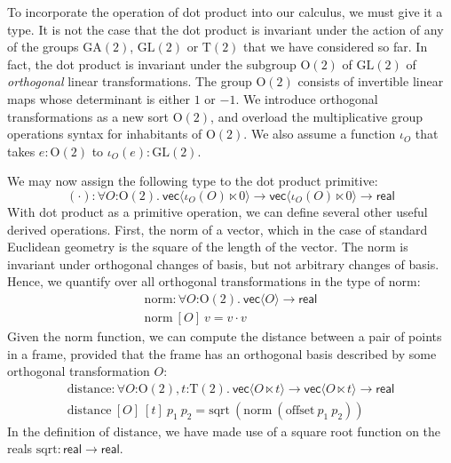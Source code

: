 \documentclass{article}
\newcommand{\GA}{\mathrm{GA}}
\newcommand{\GL}{\mathrm{GL}}
\newcommand{\Orth}{\mathrm{O}}
\newcommand{\Transl}{\mathrm{T}}
\begin{document}
To incorporate the operation of dot product into our calculus, we must
give it a type. It is not the case that the dot product is invariant
under the action of any of the groups $\GA(2)$, $\GL(2)$ or
$\Transl(2)$ that we have considered so far. In fact, the dot product
is invariant under the subgroup $\Orth(2)$ of $\GL(2)$ of
\emph{orthogonal} linear transformations. The group $\Orth(2)$
consists of invertible linear maps whose determinant is either $1$ or
$-1$. We introduce orthogonal transformations as a new sort
$\Orth(2)$, and overload the multiplicative group operations syntax
for inhabitants of $\Orth(2)$. We also assume a function $\iota_O$
that takes $e : \Orth(2)$ to $\iota_O(e) : \GL(2)$.

We may now assign the following type to the dot product primitive:
\begin{displaymath}
  (\cdot) : \forall O \mathord: \Orth(2).\ \mathsf{vec}\langle \iota_O(O) \ltimes 0 \rangle \to \mathsf{vec}\langle \iota_O(O) \ltimes 0 \rangle \to \mathsf{real}
\end{displaymath}
With dot product as a primitive operation, we can define several other
useful derived operations. First, the norm of a vector, which in the
case of standard Euclidean geometry is the square of the length of the
vector. The norm is invariant under orthogonal changes of basis, but
not arbitrary changes of basis. Hence, we quantify over all orthogonal
transformations in the type of $\mathrm{norm}$:
\begin{displaymath}
  \begin{array}{l}
    \mathrm{norm} : \forall O \mathord: \Orth(2).\ \mathsf{vec}\langle O \rangle \to \mathsf{real} \\
    \mathrm{norm}\ [O]\ v = v \cdot v
  \end{array}
\end{displaymath}
Given the norm function, we can compute the distance between a pair of
points in a frame, provided that the frame has an orthogonal basis
described by some orthogonal transformation $O$:
\begin{displaymath}
  \begin{array}{l}
    \mathrm{distance} : \forall O \mathord: \Orth(2), t \mathord: \Transl(2).\ \mathsf{vec}\langle O \ltimes t \rangle \to \mathsf{vec}\langle O \ltimes t \rangle \to \mathsf{real} \\
    \mathrm{distance}\ [O]\ [t]\ p_1\ p_2 = \mathrm{sqrt}\ (\mathrm{norm}\ (\mathrm{offset}\ p_1\ p_2))
  \end{array}
\end{displaymath}
In the definition of $\mathrm{distance}$, we have made use of a square
root function on the reals $\mathrm{sqrt} : \mathsf{real} \to
\mathsf{real}$.
\end{document}
